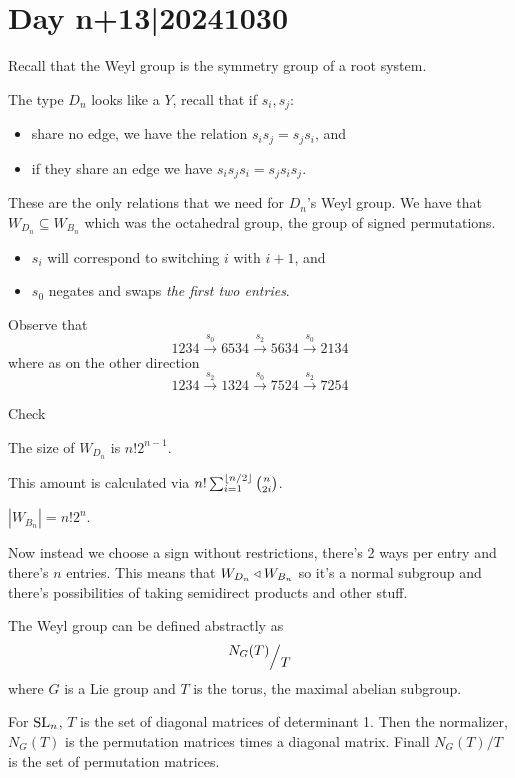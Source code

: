 \documentclass[12pt]{memoir}
\begin{document}
\section{Day n+13|20241030}

Recall that the Weyl group is the symmetry group of a root system.\par
The type $D_n$ looks like a $Y$, recall that if $s_i,s_j$:
\begin{itemize}
    \item share no edge, we have the relation $s_is_j=s_js_i$, and
    \item if they share an edge we have $s_is_js_i=s_js_is_j$.
\end{itemize}
These are the only relations that we need for $D_n$'s Weyl group. We have that $W_{D_n}\subseteq W_{B_n}$ which was the octahedral group, the group of signed permutations.
\begin{itemize}
    \item $s_i$ will correspond to switching $i$ with $i+1$, and
    \item $s_0$ negates and swaps \emph{the first two entries}. 
\end{itemize}
Observe that
$$1234\xrightarrow{s_0}6534\xrightarrow{s_2}5634\xrightarrow{s_0}2134$$
where as on the other direction 
$$1234\xrightarrow{s_2}1324\xrightarrow{s_0}7524\xrightarrow{s_2}7254$$
\begin{Ej}
    Check
\end{Ej}

\begin{Lem}
    The size of $W_{D_n}$ is $n!2^{n-1}$.
\end{Lem}

This amount is calculated via $n!\sum_{i=1}^{\lfloor n/2\rfloor}\binom{n}{2i}$.

\begin{Lem}
    $|W_{B_n}|=n!2^n$.
\end{Lem}
Now instead we choose a sign without restrictions, there's 2 ways per entry and there's $n$ entries. This means that $W_{D_n}\triangleleft W_{B_n}$ so it's a normal subgroup and there's possibilities of taking semidirect products and other stuff.

\begin{Def}
    The Weyl group can be defined abstractly as 
    $$\quot{N_G(T)}{T}$$
    where $G$ is a Lie group and $T$ is the torus, the maximal abelian subgroup.
\end{Def}

\begin{Ex}
    For $\mathrm{SL}_n$, $T$ is the set of diagonal matrices of determinant 1. Then the normalizer, $N_G(T)$ is the permutation matrices times a diagonal matrix. Finall $N_G(T)/T$ is the set of permutation matrices.
\end{Ex}
\end{document}
